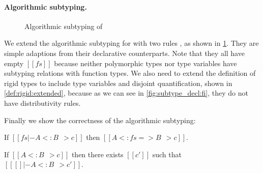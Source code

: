 \paragraph{Algorithmic subtyping.}



\begin{figure}[t]
  \centering
  \caption{Algorithmic subtyping of \fnamee}
  \label{fig:algo:sub:fi}
\end{figure}

We extend the algorithmic subtyping for \namee with two rules
, as shown in \cref{fig:algo:sub:fi}. They are simple
adaptions from their declarative counterparts. Note that they all have empty
$[[fs]]$ because neither polymorphic types nor type variables have subtyping
relations with function types. We also need to extend the definition of rigid
types to include type variables and disjoint quantification, shown in
\cref{def:rigid:extended}, because as we can see in \cref{fig:subtype_decl:fi},
they do not have distributivity rules.

\begin{definition} \label{def:rigid:extended}
\end{definition}

Finally we show the correctness of the algorithmic subtyping:

\begin{conjecture}[Soundness]
  If $[[ fs |- A <: B ~~> c]]$ then $ [[   A <: fs => B ~~> c  ]]   $.
\end{conjecture}

\begin{conjecture}[Completeness]
  If $[[A <: B ~~> c]]$ then there exists $[[c']]$ such that $[[ [] |- A <: B ~~> c']]$.
\end{conjecture}



